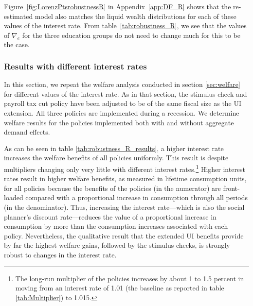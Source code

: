 \documentclass[\econtexRoot/EGMN]{subfiles}
\begin{document}
Figure~\ref{fig:LorenzPtsrobustnessR} in Appendix~\ref{app:DF_R} shows that the re-estimated model also matches the liquid wealth distributions for each of these values of the interest rate. From table~\ref{tab:robustness_R}, we see that the values of $\nabla_e$ for the three education groups do not need to change much for this to be the case.

\FloatBarrier
\subsubsection{Results with different interest rates}
\notinsubfile{\label{sec:robust_R_results}}

In this section, we repeat the welfare analysis conducted in section \ref{sec:welfare} for different values of the interest rate. As in that section, the stimulus check and payroll tax cut policy have been adjusted to be of the same fiscal size as the UI extension. All three policies are implemented during a recession. We determine welfare results for the policies implemented both with and without aggregate demand effects.

As can be seen in table \ref{tab:robustness_R_results}, a higher interest rate increases the welfare benefits of all policies uniformly. This result is despite multipliers changing only very little with different interest rates.\footnote{The long-run multiplier of the policies increases by about 1 to 1.5 percent in moving from an interest rate of 1.01 (the baseline as reported in table \ref{tab:Multiplier}) to 1.015.} Higher interest rates result in higher welfare benefits, as measured in lifetime consumption units, for all policies because the benefits of the policies (in the numerator) are front-loaded compared with a proportional increase in consumption through all periods (in the denominator). Thus, increasing the interest rate---which is also the social planner's discount rate---reduces the value of a proportional increase in consumption by more than the consumption increases associated with each policy.  Nevertheless, the qualitative result that the extended UI benefits provide by far the highest welfare gains, followed by the stimulus checks, is strongly robust to changes in the interest rate.
\end{document}
